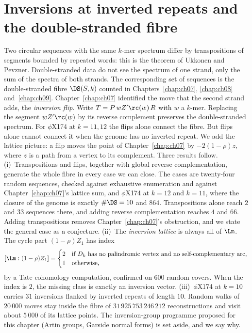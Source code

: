 \chapter[Inversions at inverted repeats]{Inversions at inverted repeats and the double-stranded fibre}\label{chap:ch11}
\begin{chaptersummary}
Two circular sequences with the same $k$-mer spectrum differ by transpositions of segments bounded by
repeated words: this is the theorem of Ukkonen and Pevzner. Double-stranded data do not see the
spectrum of one strand, only the sum of the spectra of both strands. The corresponding set of sequences
is the double-stranded fibre $\DS(S,k)$ counted in Chapters~\ref{chap:ch07}, \ref{chap:ch08} and~\ref{chap:ch09}. Chapter~\ref{chap:ch07} identified the move that
the second strand adds, the \emph{inversion flip}. Write $T=P\,wZ'\rc(w)\,R$ with $w$ a $k$-mer. Replacing
the segment $wZ'\rc(w)$ by its reverse complement preserves the double-stranded spectrum. For
$\phi$X174 at $k=11,12$ the flips alone connect the fibre. But flips alone cannot connect it when the
genome has no inverted repeat. We add the lattice picture: a flip moves the point of Chapter~\ref{chap:ch07} by
$-2(1-\rho)z$, where $z$ is a path from a vertex to its complement. Three results follow.
(i)~Transpositions and flips, together with global reverse complementation, generate the whole fibre
in every case we can close. The cases are twenty-four random sequences, checked against exhaustive
enumeration and against Chapter~\ref{chap:ch07}'s lattice sum, and $\phi$X174 at $k=12$ and $k=11$, where the closure of
the genome is exactly $\#\DS=10$ and $864$. Transpositions alone reach $2$ and $33$ sequences there,
and adding reverse complementation reaches $4$ and $66$. Adding transpositions removes Chapter~\ref{chap:ch07}'s
obstruction, and we state the general case as a conjecture.
(ii)~The \emph{inversion lattice} is always all of $\Lm$. The cycle part $(1-\rho)Z_1$ has index
\[
[\Lm:(1-\rho)Z_1]=\begin{cases}2&\text{if $D_k$ has no palindromic vertex and no self-complementary arc,}\\
1&\text{otherwise,}\end{cases}
\]
by a Tate-cohomology computation, confirmed on $600$ random covers. When the index is $2$, the missing
class is exactly an inversion vector.
(iii)~$\phi$X174 at $k=10$ carries $31$ inversions flanked by inverted repeats of length $10$. Random
walks of $20\,000$ moves stay inside the fibre of $31\,925\,753\,246\,212$ reconstructions and visit
about $5\,000$ of its lattice points. The inversion-group programme proposed for this chapter (Artin
groups, Garside normal forms) is set aside, and we say why.
\end{chaptersummary}

